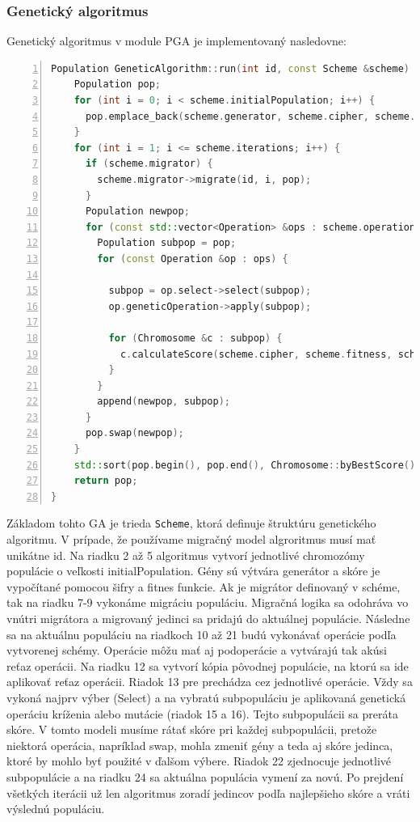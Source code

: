 \subsubsection{Genetický algoritmus}
Genetický algoritmus v module PGA je implementovaný nasledovne:
\begin{lstlisting}[language={c++}, caption={Genetický algoritmus}, numbers=left]
  Population GeneticAlgorithm::run(int id, const Scheme &scheme) {
    Population pop;
    for (int i = 0; i < scheme.initialPopulation; i++) {
      pop.emplace_back(scheme.generator, scheme.cipher, scheme.fitness);
    }
    for (int i = 1; i <= scheme.iterations; i++) {
      if (scheme.migrator) {
        scheme.migrator->migrate(id, i, pop);
      }
      Population newpop;
      for (const std::vector<Operation> &ops : scheme.operations) {
        Population subpop = pop;
        for (const Operation &op : ops) {
          
          subpop = op.select->select(subpop);
          op.geneticOperation->apply(subpop);
          
          for (Chromosome &c : subpop) {
            c.calculateScore(scheme.cipher, scheme.fitness, scheme.cache);
          }
        }
        append(newpop, subpop);
      }
      pop.swap(newpop);
    }
    std::sort(pop.begin(), pop.end(), Chromosome::byBestScore());
    return pop;
}
\end{lstlisting}
Základom tohto GA je trieda \texttt{Scheme}, ktorá definuje štruktúru genetického algoritmu. V prípade, že používame migračný model algroritmus musí mať unikátne id.
Na riadku 2 až 5 algoritmus vytvorí jednotlivé chromozómy populácie o veľkosti initialPopulation. Gény sú výtvára generátor a skóre je vypočítané pomocou šifry a fitnes funkcie. 
Ak je migrátor definovaný v schéme, tak na riadku 7-9 vykonáme migráciu populáciu. Migračná logika sa odohráva vo vnútri migrátora a migrovaný jedinci sa pridajú do aktuálnej populácie. Následne sa na aktuálnu populáciu na riadkoch 10 až 21 budú vykonávať operácie podľa vytvorenej schémy. Operácie môžu mať aj podoperácie a vytvárajú tak akúsi reťaz operácii. Na riadku 12 sa vytvorí kópia pôvodnej populácie, na ktorú sa ide aplikovať reťaz operácii. Riadok 13 pre prechádza cez jednotlivé operácie. Vždy sa vykoná najprv výber (Select) a na vybratú subpopuláciu je aplikovaná genetická operáciu kríženia alebo mutácie (riadok 15 a 16). Tejto subpopulácii sa preráta skóre. V tomto modeli musíme rátať skóre pri každej subpopulácii, pretože niektorá operácia, napríklad swap, mohla zmeniť gény a teda aj skóre jedinca, ktoré by mohlo byť použité v ďalšom výbere. Riadok 22 zjednocuje jednotlivé subpopulácie a na riadku 24 sa aktuálna populácia vymení za novú. Po prejdení všetkých iterácii už len algoritmus zoradí jedincov podľa najlepšieho skóre a vráti výslednú populáciu.

